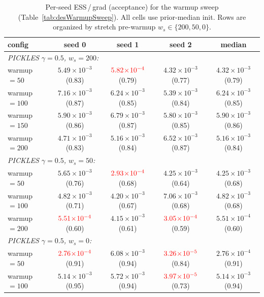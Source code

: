 \documentclass{article}
\begin{document}
\begin{table}[h]
\centering
\caption{Per-seed ESS\,/\,grad (acceptance) for the warmup sweep
(Table~\ref{tab:desWarmupSweep}).  All cells use prior-median init.
Rows are organized by stretch pre-warmup $w_s \in \{200, 50, 0\}$.}
\label{tab:desPerSeedWarmupSweep}
\small
\setlength{\tabcolsep}{3pt}
\begin{tabular}{l c c c c}
\toprule
config & seed 0 & seed 1 & seed 2 & median \\
\midrule
\multicolumn{5}{l}{\emph{PICKLES $\gamma=0.5$, $w_s=200$:}} \\
\quad warmup $=50$  & $5.49\!\times\!10^{-3}$ (0.83) & $\textcolor{red}{5.82\!\times\!10^{-4}}$ (0.79) & $4.32\!\times\!10^{-3}$ (0.77) & $4.32\!\times\!10^{-3}$ (0.79) \\
\quad warmup $=100$ & $7.16\!\times\!10^{-3}$ (0.87) & $6.24\!\times\!10^{-3}$ (0.85) & $5.39\!\times\!10^{-3}$ (0.84) & $6.24\!\times\!10^{-3}$ (0.85) \\
\quad warmup $=150$ & $5.90\!\times\!10^{-3}$ (0.86) & $6.79\!\times\!10^{-3}$ (0.87) & $5.80\!\times\!10^{-3}$ (0.85) & $5.90\!\times\!10^{-3}$ (0.86) \\
\quad warmup $=200$ & $4.71\!\times\!10^{-3}$ (0.83) & $5.16\!\times\!10^{-3}$ (0.84) & $6.52\!\times\!10^{-3}$ (0.87) & $5.16\!\times\!10^{-3}$ (0.84) \\
\midrule
\multicolumn{5}{l}{\emph{PICKLES $\gamma=0.5$, $w_s=50$:}} \\
\quad warmup $=50$  & $5.65\!\times\!10^{-3}$ (0.76) & $\textcolor{red}{2.93\!\times\!10^{-4}}$ (0.68) & $4.25\!\times\!10^{-3}$ (0.64) & $4.25\!\times\!10^{-3}$ (0.68) \\
\quad warmup $=100$ & $4.82\!\times\!10^{-3}$ (0.71) & $4.20\!\times\!10^{-3}$ (0.67) & $7.06\!\times\!10^{-3}$ (0.68) & $4.82\!\times\!10^{-3}$ (0.68) \\
\quad warmup $=200$ & $\textcolor{red}{5.51\!\times\!10^{-4}}$ (0.60) & $4.15\!\times\!10^{-3}$ (0.61) & $\textcolor{red}{3.05\!\times\!10^{-4}}$ (0.59) & $5.51\!\times\!10^{-4}$ (0.60) \\
\midrule
\multicolumn{5}{l}{\emph{PICKLES $\gamma=0.5$, $w_s=0$:}} \\
\quad warmup $=50$  & $\textcolor{red}{2.76\!\times\!10^{-4}}$ (0.91) & $6.08\!\times\!10^{-3}$ (0.94) & $\textcolor{red}{3.26\!\times\!10^{-5}}$ (0.84) & $2.76\!\times\!10^{-4}$ (0.91) \\
\quad warmup $=100$ & $5.14\!\times\!10^{-3}$ (0.95) & $5.72\!\times\!10^{-3}$ (0.94) & $\textcolor{red}{3.97\!\times\!10^{-5}}$ (0.73) & $5.14\!\times\!10^{-3}$ (0.94) \\

\end{tabular}
\end{table}
\end{document}
